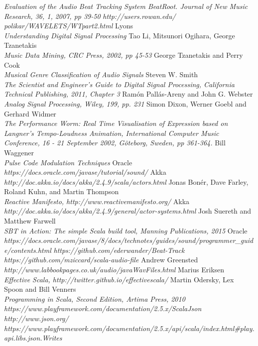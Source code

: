 \documentclass[a4paper, 11pt]{article}
\begin{document}
\begin{thebibliography}{99}
\textit{Evaluation of the Audio Beat Tracking System BeatRoot. Journal of New Music Research, 36, 1, 2007, pp 39-50}
\textit{http://users.rowan.edu/ polikar/WAVELETS/WTpart2.html}
Lyons\\
\textit{Understanding Digital Signal Processing}
Tao Li, Mitsunori Ogihara, George Tzanetakis\\
\textit{Music Data Mining, CRC Press, 2002, pp 45-53}
George Tzanetakis and Perry Cook\\
\textit{Musical Genre Classification of Audio Signals}
Steven W. Smith\\
\textit{The Scientist and Engineer's Guide to Digital Signal Processing, California Technical Publishing, 2011, Chapter 3}
Ramón Pallás-Areny and John G. Webster\\
\textit{Analog Signal Processing, Wiley, 199, pp. 231}
Simon Dixon, Werner Goebl and Gerhard Widmer\\
\textit{The Performance Worm: Real Time Visualisation of Expression based on Langner’s Tempo-Loudness Animation, International Computer Music Conference, 16 - 21 September 2002, Göteborg, Sweden, pp 361-364.}
Bill Waggener\\
\textit{Pulse Code Modulation Techniques}
Oracle\\
\textit{https://docs.oracle.com/javase/tutorial/sound/}
Akka\\
\textit{http://doc.akka.io/docs/akka/2.4.9/scala/actors.html}
Jonas Bonér, Dave Farley, Roland Kuhn, and Martin Thompson\\
\textit{Reactive Manifesto, http://www.reactivemanifesto.org/}
Akka\\
\textit{http://doc.akka.io/docs/akka/2.4.9/general/actor-systems.html}
Josh Suereth and Matthew Farwell\\
\textit{SBT in Action: The simple Scala build tool, Manning Publications, 2015}
Oracle\\
\textit{https://docs.oracle.com/javase/8/docs/technotes/guides/sound/programmer\_guide/contents.html}
\textit{https://github.com/ederwander/Beat-Track}
\textit{https://github.com/mziccard/scala-audio-file}
Andrew Greensted
\textit{http://www.labbookpages.co.uk/audio/javaWavFiles.html}
Marius Eriksen\\
\textit{Effective Scala, http://twitter.github.io/effectivescala/}
Martin Odersky, Lex Spoon and Bill Venners\\
\textit{Programming in Scala, Second Edition, Artima Press, 2010}
\textit{https://www.playframework.com/documentation/2.5.x/ScalaJson}
\textit{http://www.json.org/}
\textit{https://www.playframework.com/documentation/2.5.x/api/scala/index.html#play.api.libs.json.Writes}
\end{thebibliography}
\end{document}
